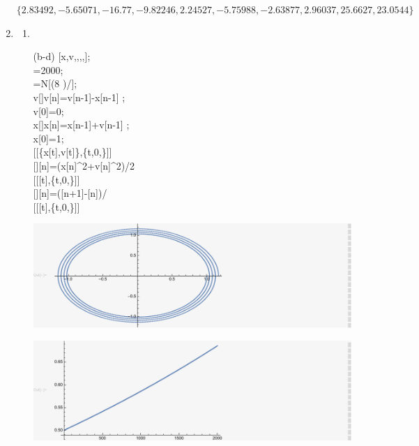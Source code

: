 \documentclass[12pt]{article}
\begin{document}
\begin{enumerate}
    \begin{doublespace}
      \noindent\(\{2.83492,-5.65071,-16.77,-9.82246,2.24527,-5.75988,-2.63877,2.96037,25.6627,23.0544\}\)
    \end{doublespace}
    \item
    \begin{enumerate}
      \item
      \item[(b-d)]
      [x,v,,,,];\\
      =2000;\\
      =N[(8 )/];\\
      v[]\text{:=}v[n]=v[n-1]-x[n-1] ;\\
      v[0]=0;\\
      x[]\text{:=}x[n]=x[n-1]+v[n-1] ;\\
      x[0]=1;\\
      [[\{x[t],v[t]\},\{t,0,\}]]\\
      []\text{:=}[n]=(x[n]{}^{\wedge}2+v[n]{}^{\wedge}2)/2\\
      [[[t],\{t,0,\}]]\\
      []\text{:=}[n]=([n+1]-[n])/\\
      [[[t],\{t,0,\}]]

      \includegraphics{HW_6_screenshots/q_5_gr1}

      \includegraphics{HW_6_screenshots/q_5_gr2}


\end{enumerate}
\end{enumerate}
\end{document}
